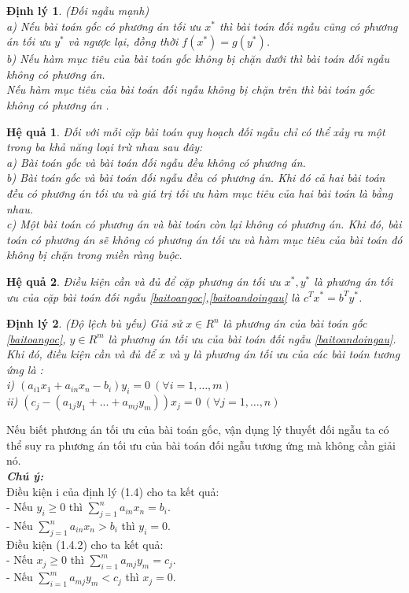 \documentclass[12pt,a4paper]{report}
\newtheorem{dl}{Định lý}
\newtheorem{hq}{Hệ quả}
\begin{document}
\begin{itemize}
\begin{dl}
        (Đối ngẫu mạnh) \\
      a) Nếu bài toán gốc có phương án tối ưu $x^*$ thì bài toán đối ngẫu cũng có phương án tối ưu $y^*$ và ngược lại, đồng thời $f(x^*)=g(y^*)$.\\
      b) Nếu hàm mục tiêu của bài toán gốc không bị chặn dưới thì bài toán đối ngẫu không có phương án.\\
        Nếu hàm mục tiêu của bài toán đối ngẫu không bị chặn trên thì bài toán gốc không có phương án .
    \end{dl}

\begin{hq}
        Đối với mỗi cặp bài toán quy hoạch đối ngẫu chỉ có thể xảy ra một trong ba khả năng loại trừ nhau sau đây:\\
        a) Bài toán gốc và bài toán đối ngẫu đều không có phương án.\\
        b) Bài toán gốc và bài toán đối ngẫu đều có phương án. Khi đó cả hai bài toán đều có phương án tối ưu và giá trị tối ưu hàm mục tiêu của hai bài toán là bằng nhau.\\
        c) Một bài toán có phương án và bài toán còn lại không có phương án. Khi đó, bài toán có phương án sẽ không có phương án tối ưu và hàm mục tiêu của bài toán đó không bị chặn trong miền ràng buộc.
    \end{hq}
    \begin{hq}
        Điều kiện cần và đủ để cặp phương án tối ưu $x^*,y^*$ là phương án tối ưu của cặp bài toán đối ngẫu \eqref{baitoangoc},\eqref{baitoandoingau} là $c^Tx^*=b^Ty^*$.
    \end{hq}
    \begin{dl}
        (Độ lệch bù yếu) Giả sử $x \in R^n$ là phương án của bài toán gốc \eqref{baitoangoc}, $y\in R^m$ là phương án tối ưu của bài toán đối ngẫu \eqref{baitoandoingau}. Khi đó, điều kiện cần và đủ để $x$ và $y$ là phương án tối ưu của các bài toán tương ứng là :\\
        i) $(a_{i1}x_1 +a_{in}x_n -b_i)y_i=0 \: (\forall {i=1,\ldots,m}) $ \\
        ii) $(c_j-(a_{1j} y_1+...+a_{mj}y_m))x_j=0 \: (\forall{j=1,\ldots ,n}) $ \\   
    \end{dl}
    Nếu biết phương án tối ưu của bài toán gốc, vận dụng lý thuyết đối ngẫu ta có thể suy ra phương án tối ưu của bài toán đối ngẫu tương ứng mà không cần giải nó.\\
    \textbf{\textit{Chú ý:}} \\
    Điều kiện i của định lý (1.4) cho ta kết quả:\\
        - Nếu $y_i \ge 0 $ thì $\sum_{j=1}^n a_{in}x_n=b_i.$\\
        - Nếu $\sum_{j=1}^n a_{in}x_n >b_i$ thì $y_i=0$.\\ 
    Điều kiện (1.4.2) cho ta kết quả:\\
        - Nếu $x_j \ge 0$ thì $\sum_{i=1}^m a_{mj}y_m=c_j.$\\
        - Nếu $\sum_{i=1}^m a_{mj}y_m<c_j$ thì $x_j=0$.\\
    \end{itemize}
\end{document}
